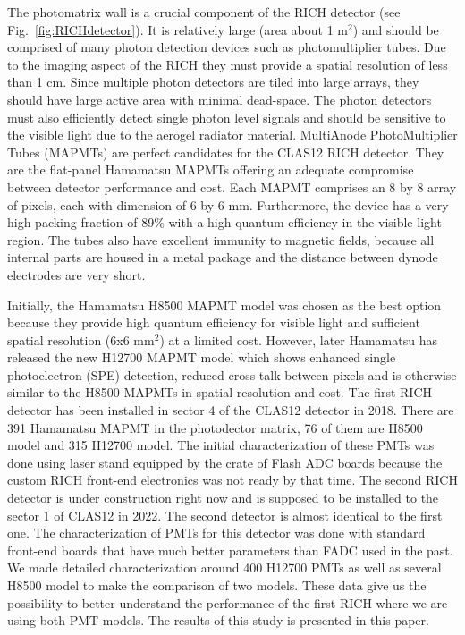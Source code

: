 The photomatrix  wall is a crucial component of the RICH detector (see Fig.~\ref{fig:RICHdetector}). It is relatively large (area about 1 m$^2$) and should be comprised of many photon detection devices such as photomultiplier tubes.
Due to the imaging aspect of the RICH they must provide a spatial resolution of less than 1 cm.
Since multiple photon detectors are tiled into large arrays, they should have large active area with minimal dead-space.
The photon detectors must also efficiently detect single photon level signals and should be sensitive to the visible light due to the aerogel radiator material.
MultiAnode PhotoMultiplier Tubes (MAPMTs) are perfect candidates for the CLAS12 RICH detector.
They are the flat-panel Hamamatsu MAPMTs offering an adequate compromise between detector performance and cost.
Each MAPMT comprises an 8 by 8 array of pixels, each with dimension of 6 by 6 mm.
Furthermore, the device has a very high packing fraction of 89\% with a high quantum efficiency in the visible light region.
The tubes also have excellent immunity to magnetic fields, because all internal parts are housed in a metal package and the distance between dynode electrodes are very short.


Initially, the Hamamatsu H8500 MAPMT model \cite{H8500} was chosen as the best option because they provide high quantum efficiency for visible light and sufficient spatial resolution (6x6 mm$^2$) at a limited cost.  However, later Hamamatsu has released the new H12700 MAPMT model  \cite{H12700} which shows enhanced single photoelectron (SPE) detection, reduced cross-talk between pixels and is otherwise similar to the H8500 MAPMTs in spatial resolution and  cost. The first RICH detector has been installed in sector 4 of the CLAS12 detector in 2018. There are 391 Hamamatsu MAPMT  in the photodector matrix, 76 of them are H8500 model and 315 H12700 model. 
The initial characterization of these PMTs was done using laser stand equipped by the crate of Flash ADC  boards \cite{FADC250} because the custom RICH front-end electronics \cite{RICH_FE} was not ready by that time. The second RICH detector is under construction right now and is supposed  to be installed to the sector 1 of CLAS12 in 2022. The second detector is almost identical to the first one. The characterization of PMTs for this detector was done with standard front-end boards that have much better parameters than FADC used in the past. We made detailed characterization around 400 H12700 PMTs as well as several H8500 model to make the comparison of two models. These data give us the possibility to better understand the performance of the first RICH where we are using both PMT models. The results of this study is presented in this paper.



